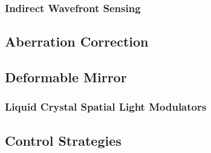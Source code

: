 \subsubsection{Indirect Wavefront Sensing}
\label{sec:IndirectWavefrontSensing}

\subsection{Aberration Correction}
\label{sec:AberrationCorrection}

\subsection{Deformable Mirror }
\label{sec:DeformableMirror}

\subsubsection{Liquid Crystal Spatial Light Modulators}
\label{sec:LiquidCrystalSpatialLightModulators}

\subsection{Control Strategies}
\label{sec:ControlStrategies}
